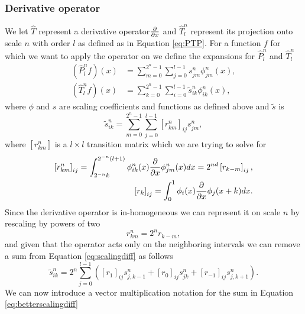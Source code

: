 \documentclass[../master_thesis.tex]{subfiles}
\begin{document}
\subsubsection{Derivative operator}
We let $\hat{T}$ represent a derivative operator$\frac{\partial}{\partial x}$ and  $\hat{T}^n_{l}$
represent its projection onto scale $n$ with order $l$ as defined as in Equation
\ref{eq:PTP}. For a function $f$ for which we want to apply the operator on we
define the expansions for $\hat{P}^n_l$ and $\hat{T}^n_{l}$ \cite{Beylkin1999AdaptiveSO}
\begin{equation}
  \begin{aligned}
    \left(\hat{P}^{n}_{l} f\right)(x) &=\sum_{m=0}^{2^{n}-1} \sum_{j=0}^{l-1} s_{j m}^{n} \phi_{j m}^{n}(x), \\
    \left(\hat{T}^{n}_{l} f\right)(x) &=\sum_{k=0}^{2^{n}-1} \sum_{i=0}^{l-1} \tilde{s}_{i k}^{n} \phi_{i k}^{n}(x),
  \end{aligned}
\end{equation}
where $\phi$ and $s$ are scaling coefficients and functions as defined above and $\tilde{s}$ is
\begin{equation}\label{eq:scalingdiff}
\tilde{s}_{i k}^{n}=\sum_{m=0}^{2^{n}-1} \sum_{j=0}^{l-1}\left[r_{km}^{n}\right]_{i j} s_{j m}^{n},
\end{equation}
where $\left[r_{k m}^{n}\right]$ is a $l\times l$ transition matrix which we are
trying to solve for
\begin{align}
\left[r_{k m}^{n}\right]_{i j}=\int_{2^{-n} k}^{2^{-n}(l+1)} \phi_{i k}^{n}(x) \frac{\partial}{\partial x} \phi_{j m}^{n}(x) d x=2^{n d}\left[r_{k-m}\right]_{i j},\\
\left[r_{k}\right]_{i j}=\int_{0}^{1} \phi_{i}(x) \frac{\partial}{\partial x} \phi_{j}(x+k) d x.
\end{align}
Since the derivative operator is in-homogeneous we can represent it on scale $n$
by rescaling by powers of two
\begin{equation}
  r_{k m}^{n}=2^{n} r_{k-m},
\end{equation}
and given that the operator acts only on the neighboring intervals we can remove a sum from
Equation \ref{eq:scalingdiff} as follows
\begin{equation}\label{eq:betterscalingdiff}
\tilde{s}_{i k}^{n}=2^{n} \sum_{j=0}^{l-1}\left(\left[r_{1}\right]_{i j} s_{j, k-1}^{n}+\left[r_{0}\right]_{i j} s_{j k}^{n}+\left[r_{-1}\right]_{i j} s_{j, k+1}^{n}\right).
\end{equation}
We can now introduce a vector multiplication notation for the sum in Equation
\ref{eq:betterscalingdiff}
\end{document}
